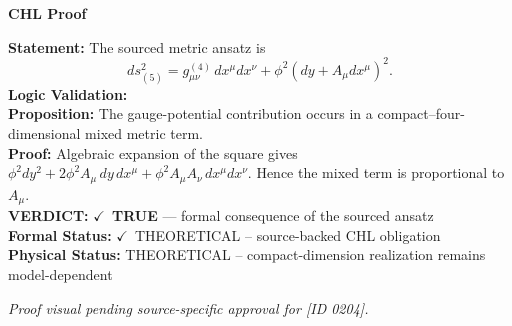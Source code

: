 \vspace{0.45em}
\noindent\textbf{CHL Proof}\par
\textbf{Statement:} The sourced metric ansatz is
\[
ds^2_{(5)}=g^{(4)}_{\mu\nu}\,dx^{\mu}dx^{\nu}+\phi^2\!\left(dy+A_{\mu}dx^{\mu}\right)^2.
\]
\textbf{Logic Validation:}\\
\textbf{Proposition:} The gauge-potential contribution occurs in a compact--four-dimensional mixed metric term.\\
\textbf{Proof:} Algebraic expansion of the square gives \(\phi^2dy^2+2\phi^2A_{\mu}\,dy\,dx^{\mu}+\phi^2A_{\mu}A_{\nu}\,dx^{\mu}dx^{\nu}\). Hence the mixed term is proportional to \(A_{\mu}\).\\
\textbf{VERDICT:} \ensuremath{\checkmark}\ \textbf{TRUE} --- formal consequence of the sourced ansatz\\
\textbf{Formal Status:} \ensuremath{\checkmark}\ THEORETICAL -- source-backed CHL obligation\\
\textbf{Physical Status:} THEORETICAL -- compact-dimension realization remains model-dependent
\par\vspace{0.45em}
\par
\vfill
\begingroup\footnotesize\itshape
Proof visual pending source-specific approval for [ID 0204].
\par\endgroup
\vfill
\endgroup
\endgroup
